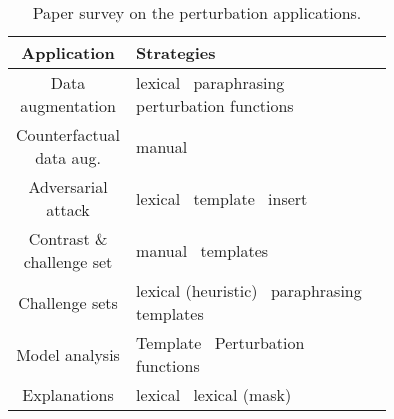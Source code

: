 \begin{table*}[t]
\small
\centering
\setlength{\tabcolsep}{3.5pt}
\begin{tabular}{c p{0.75\linewidth}}
\toprule
\textbf{Application} & \textbf{Strategies} \\ 
\midrule
Data augmentation & 
    lexical~\cite{Wu2019ConditionalBC, Wei2019EDAED, Kumar2020DataAU}\newline
    paraphrasing~\cite{iyyer2018adversarial} \newline
    perturbation functions~\cite{ratner2017snorkel}
\\\midrule
Counterfactual data aug. & 
    manual~\cite{kaushik2019learning}
\\\midrule
Adversarial attack & 
    lexical~\cite{alzantot2018generating, garg2020bae, li-etal-2020-bert-attack, morris2020textattack, tan2020s, jin2020bert, ebrahimi2017hotflip, Zhang2019GeneratingFA, Jia2019CertifiedRT} \newline
    template~\cite{jiang2019avoiding}\newline
    insert~\cite{Song2020UniversalAA}
\\\midrule
Contrast \& challenge set & 
    manual~\cite{li2020linguistically} \newline
    templates~\cite{li2020linguistically}
\\\midrule
Challenge sets  & 
    lexical (heuristic)~\cite{kaushik2019learning, naik2018stress} \newline
    paraphrasing~\cite{Kavumba2019WhenCP} \newline
    templates~\cite{Geiger2019PosingFG, kaushik2019learning, nie2019analyzing, mccoy2019right}
\\\midrule
Model analysis & 
    Template~\cite{Goodwin2020ProbingLS}\newline
    Perturbation functions~\cite{wu2019errudite, bowman-etal-2015-large}
\\\midrule
Explanations & 
    lexical~\cite{hase2020evaluating, vig2020causal, kang2020counterfactual} \newline
    lexical (mask)~\cite{ramon2019counterfactual, ribeiro2018anchors}
\\
\bottomrule
\end{tabular}
\vspace{-5pt}

\caption{Paper survey on the perturbation applications.}
\label{table:perturb_application}
\vspace{-10pt}

\end{table*}

